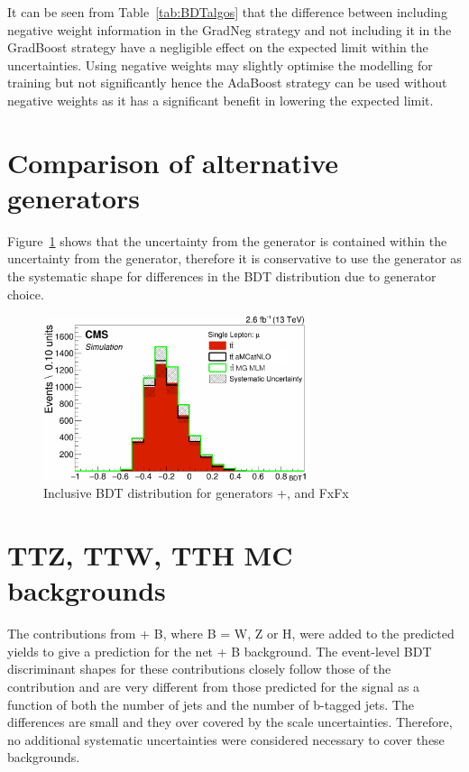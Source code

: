 It can be seen from Table~\ref{tab:BDTalgos} that the difference between including negative weight information in the GradNeg strategy and not including it in the GradBoost strategy have a negligible effect on the expected limit within the uncertainties. Using negative weights may slightly optimise the modelling for training but not significantly hence the AdaBoost strategy can be used without negative weights as it has a significant benefit in lowering the expected limit.

\section{Comparison of alternative \ttbar generators}

Figure~\ref{fig:MGFXFX} shows that the uncertainty from the \MADGRAPH \aMCATNLO generator is contained within the uncertainty from the \MLM generator, therefore it is conservative to use the \MLM generator as the systematic shape for differences in the BDT distribution due to generator choice.

\begin{figure}[ht]
\centering
    \includegraphics[width=0.7\textwidth]{images/Run2/MG_FXFX.pdf}
    \caption{Inclusive BDT distribution for \ttbar generators \POWHEG+\PYTHIA, \MLM and \MADGRAPH \aMCATNLO FxFx}
    \label{fig:MGFXFX}
\end{figure} 


\section{TTZ, TTW, TTH MC backgrounds~\label{app:TTX}}
The contributions from \ttbar + B, where B = W, Z or H, were added to the predicted \ttbar yields to give a prediction for the net \ttbar + B background. The event-level BDT discriminant shapes for these contributions closely follow those of the \ttbar contribution and are very different from those predicted for the \tttt signal as a function of both the number of jets and the number of b-tagged jets. The differences are small and they over covered by the \ttbar scale uncertainties. Therefore, no additional systematic uncertainties were considered necessary to cover these backgrounds.


